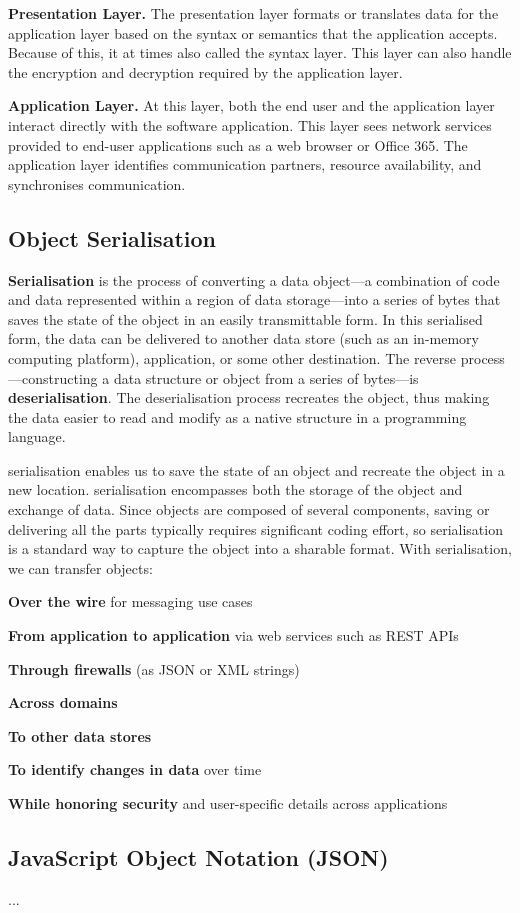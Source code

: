 \documentclass[../report.tex]{subfiles}
\begin{document}
\textbf{Presentation Layer.} The presentation layer formats or translates data for the application layer based on the syntax or semantics that the application accepts. Because of this, it at times also called the syntax layer. This layer can also handle the encryption and decryption required by the application layer.

\textbf{Application Layer.} At this layer, both the end user and the application layer interact directly with the software application. This layer sees network services provided to end-user applications such as a web browser or Office 365. The application layer identifies communication partners, resource availability, and synchronises communication.


\pagebreak

\subsection{Object Serialisation} %

\textbf{Serialisation} is the process of converting a data object—a combination of code and data represented within a region of data storage—into a series of bytes that saves the state of the object in an easily transmittable form. In this serialised form, the data can be delivered to another data store (such as an in-memory computing platform), application, or some other destination. The reverse process—constructing a data structure or object from a series of bytes—is \textbf{deserialisation}. The deserialisation process recreates the object, thus making the data easier to read and modify as a native structure in a programming language.

serialisation enables us to save the state of an object and recreate the object in a new location. serialisation encompasses both the storage of the object and exchange of data. Since objects are composed of several components, saving or delivering all the parts typically requires significant coding effort, so serialisation is a standard way to capture the object into a sharable format. With serialisation, we can transfer objects:

\textbf{Over the wire} for messaging use cases

\textbf{From application to application} via web services such as REST APIs

\textbf{Through firewalls} (as JSON or XML strings)

\textbf{Across domains}

\textbf{To other data stores}

\textbf{To identify changes in data} over time

\textbf{While honoring security} and user-specific details across applications

\subsection{JavaScript Object Notation (JSON)}

...
\end{document}
